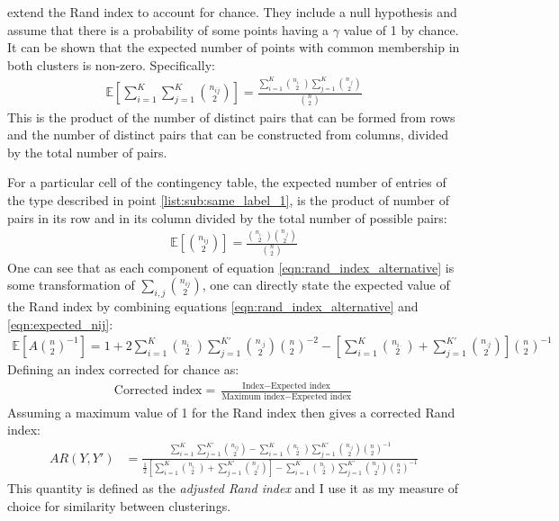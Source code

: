 \documentclass[12pt]{article} %
\begin{document}
	\citet{HubertComparingpartitions1985} extend the Rand index to account for chance. They include a null hypothesis and assume that there is a probability of some points having a $\gamma$ value of 1 by chance. It can be shown that the expected number of points with common membership in both clusters is non-zero. Specifically:
	\begin{eqnarray}
	\mathbb{E}\left[\sum_{i=1}^K \sum_{j=1}^K\binom{n_{ij}}{2}\right] = \frac{\sum_{i=1}^K \binom{n_{i\cdot}}{2} \sum_{j=1}^K \binom{n_{\cdot j}}{2}}{\binom{n}{2}}
	\end{eqnarray}
	This is the product of the number of distinct pairs that can be formed from rows and the number of distinct pairs that can be constructed from columns, divided by the total number of pairs. 
	
	For a particular cell of the contingency table, the expected number of entries of the type described in point \ref{list:sub:same_label_1}, is the product of number of pairs in its row and in its column divided by the total number of possible pairs:
	\begin{eqnarray} \label{eqn:expected_nij}
	\mathbb{E}\left[\binom{n_{ij}}{2}\right] = \frac{\binom{n_{i\cdot}}{2}\binom{n_{\cdot j}}{2}}{\binom{n}{2}}
	\end{eqnarray}
	One can see that as each component of equation \ref{eqn:rand_index_alternative} is some transformation of $\sum_{i,j}\binom{n_{ij}}{2}$, one can directly state the expected value of the Rand index by combining equations \ref{eqn:rand_index_alternative} and \ref{eqn:expected_nij}:
	\begin{eqnarray}
	\mathbb{E}\left[A \binom{n}{2}^{-1}\right] = 1 + 2 \sum_{i=1}^{K} \binom{n_{i \cdot}}{2} \sum_{j=1}^{K'} \binom{n_{\cdot j}}{2} \binom{n}{2}^{-2} - \left[\sum_{i=1}^{K} \binom{n_{i \cdot}}{2} + \sum_{j=1}^{K'} \binom{n_{\cdot j}}{2}\right] \binom{n}{2}^{-1}
	\end{eqnarray}
	Defining an index corrected for chance as:
	\begin{eqnarray}
	\text{Corrected index} = \frac{\text{Index} - \text{Expected index}}{\text{Maximum index} - \text{Expected index}}
	\end{eqnarray}
	Assuming a maximum value of 1 for the Rand index then gives a corrected Rand index:
	\begin{eqnarray} \label{eqn:adjusted_rand_index}
	AR(Y, Y') &= \frac{\sum_{i=1}^{K}\sum_{j=1}^{K'} \binom{n_{ij}}{2} - \sum_{i=1}^{K} \binom{n_{i \cdot}}{2} \sum_{j=1}^{K'} \binom{n_{\cdot j}}{2} \binom{n}{2}^{-1}}{\frac{1}{2} \left[\sum_{i=1}^{K} \binom{n_{i \cdot}}{2} + \sum_{j=1}^{K'} \binom{n_{\cdot j}}{2}\right] - \sum_{i=1}^{K} \binom{n_{i \cdot}}{2} \sum_{j=1}^{K'} \binom{n_{\cdot j}}{2} \binom{n}{2}^{-1}}
	\end{eqnarray}
	This quantity is defined as the \emph{adjusted Rand index} and I use it as my measure of choice for similarity between clusterings.
	
\end{document}
